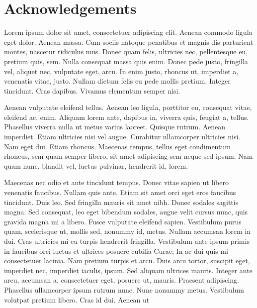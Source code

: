 \chapter*{Acknowledgements}

\begingroup
\setlength{\parskip}{1em}
\setlength{\parindent}{0pt}

Lorem ipsum dolor sit amet, consectetuer adipiscing elit. Aenean commodo ligula eget dolor. Aenean massa. Cum sociis natoque penatibus et magnis dis parturient montes, nascetur ridiculus mus. Donec quam felis, ultricies nec, pellentesque eu, pretium quis, sem. Nulla consequat massa quis enim. Donec pede justo, fringilla vel, aliquet nec, vulputate eget, arcu. In enim justo, rhoncus ut, imperdiet a, venenatis vitae, justo. Nullam dictum felis eu pede mollis pretium. Integer tincidunt. Cras dapibus. Vivamus elementum semper nisi.

Aenean vulputate eleifend tellus. Aenean leo ligula, porttitor eu, consequat vitae, eleifend ac, enim. Aliquam lorem ante, dapibus in, viverra quis, feugiat a, tellus. Phasellus viverra nulla ut metus varius laoreet. Quisque rutrum. Aenean imperdiet. Etiam ultricies nisi vel augue. Curabitur ullamcorper ultricies nisi. Nam eget dui. Etiam rhoncus. Maecenas tempus, tellus eget condimentum rhoncus, sem quam semper libero, sit amet adipiscing sem neque sed ipsum. Nam quam nunc, blandit vel, luctus pulvinar, hendrerit id, lorem.

Maecenas nec odio et ante tincidunt tempus. Donec vitae sapien ut libero venenatis faucibus. Nullam quis ante. Etiam sit amet orci eget eros faucibus tincidunt. Duis leo. Sed fringilla mauris sit amet nibh. Donec sodales sagittis magna. Sed consequat, leo eget bibendum sodales, augue velit cursus nunc, quis gravida magna mi a libero. Fusce vulputate eleifend sapien. Vestibulum purus quam, scelerisque ut, mollis sed, nonummy id, metus. Nullam accumsan lorem in dui. Cras ultricies mi eu turpis hendrerit fringilla. Vestibulum ante ipsum primis in faucibus orci luctus et ultrices posuere cubilia Curae; In ac dui quis mi consectetuer lacinia. Nam pretium turpis et arcu. Duis arcu tortor, suscipit eget, imperdiet nec, imperdiet iaculis, ipsum. Sed aliquam ultrices mauris. Integer ante arcu, accumsan a, consectetuer eget, posuere ut, mauris. Praesent adipiscing. Phasellus ullamcorper ipsum rutrum nunc. Nunc nonummy metus. Vestibulum volutpat pretium libero. Cras id dui. Aenean ut

\endgroup
